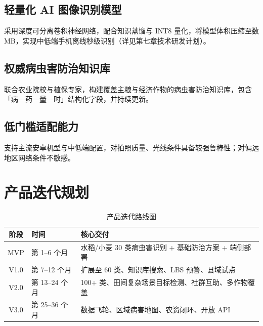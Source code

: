 \subsection{轻量化 AI 图像识别模型}

采用深度可分离卷积神经网络，配合知识蒸馏与 INT8 量化，将模型体积压缩至数 MB，实现中低端手机离线秒级识别（详见第七章技术研发计划）。

\subsection{权威病虫害防治知识库}

联合农业院校与植保专家，构建覆盖主粮与经济作物的病虫害防治知识库，包含「病—药—量—时」结构化字段，并持续更新。

\subsection{低门槛适配能力}

支持主流安卓机型与中低端配置，对拍照质量、光线条件具备较强鲁棒性；对偏远地区网络条件不敏感。

\section{产品迭代规划}

\begin{table}[H]
  \centering
  \small
  \renewcommand{\arraystretch}{1.25}
  \caption{产品迭代路线图}
  \begin{tabular}{cll}
    \toprule
    阶段 & 时间 & 核心交付 \\
    \midrule
    MVP & 第 1--6 个月 & 水稻/小麦 30 类病虫害识别 + 基础防治方案 + 端侧部署 \\
    V1.0 & 第 7--12 个月 & 扩展至 60 类、知识库搜索、LBS 预警、县域试点 \\
    V2.0 & 第 13--24 个月 & 100+ 类、田间复杂场景目标检测、社群互助、多作物覆盖 \\
    V3.0 & 第 25--36 个月 & 数据飞轮、区域病害地图、农资闭环、开放 API \\
    \bottomrule
  \end{tabular}
\end{table}
